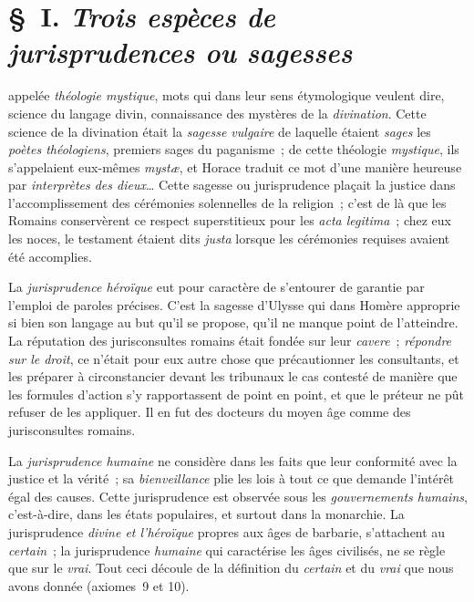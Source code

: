 \documentclass[french,twoside]{book} %
\begin{document}
\section[{§ I. Trois espèces de jurisprudences ou sagesses}]{§ I. {\itshape Trois espèces de jurisprudences ou sagesses}}
 appelée {\itshape théologie mystique}, mots qui dans leur sens étymologique veulent dire, science du langage divin, connaissance des mystères de la {\itshape divination}. Cette science de la divination était la {\itshape sagesse vulgaire} de laquelle étaient {\itshape sages} les {\itshape poètes théologiens}, premiers sages du paganisme ; de cette théologie {\itshape mystique}, ils s’appelaient eux-mêmes {\itshape mystæ}, et Horace traduit ce mot d’une manière heureuse par {\itshape interprètes des dieux}… Cette sagesse ou jurisprudence plaçait la justice dans l’accomplissement des cérémonies solennelles de la religion ; c’est de là que les Romains conservèrent ce respect superstitieux pour les {\itshape acta legitima} ; chez eux les noces, le testament étaient dits {\itshape justa} lorsque les cérémonies requises avaient été accomplies.\par
La {\itshape jurisprudence héroïque} eut pour caractère de s’entourer de garantie par l’emploi de paroles précises.  C’est la sagesse d’Ulysse qui dans Homère approprie si bien son langage au but qu’il se propose, qu’il ne manque point de l’atteindre. La réputation des jurisconsultes romains était fondée sur leur {\itshape cavere} ; {\itshape répondre sur le droit}, ce n’était pour eux autre chose que précautionner les consultants, et les préparer à circonstancier devant les tribunaux le cas contesté de manière que les formules d’action s’y rapportassent de point en point, et que le préteur ne pût refuser de les appliquer. Il en fut des docteurs du moyen âge comme des jurisconsultes romains.\par
La {\itshape jurisprudence humaine} ne considère dans les faits que leur conformité avec la justice et la vérité ; sa {\itshape bienveillance} plie les lois à tout ce que demande l’intérêt égal des causes. Cette jurisprudence est observée sous les {\itshape gouvernements humains}, c’est-à-dire, dans les états populaires, et surtout dans la monarchie. La jurisprudence {\itshape divine et l’héroïque} propres aux âges de barbarie, s’attachent au {\itshape certain} ; la jurisprudence {\itshape humaine} qui caractérise les âges civilisés, ne se règle que sur le {\itshape vrai}. Tout ceci découle de la définition du {\itshape certain} et du {\itshape vrai} que nous avons donnée (axiomes 9 et 10).
\end{document}
